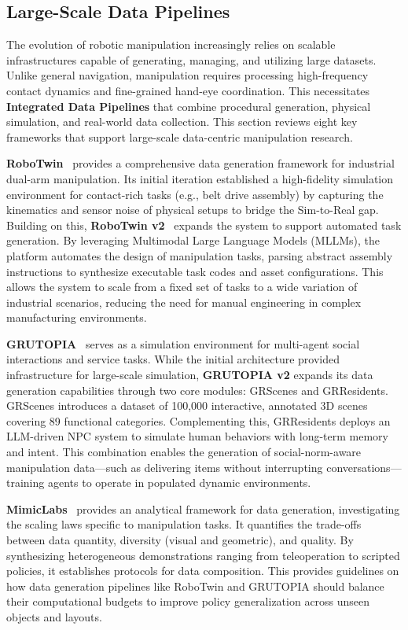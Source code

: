 \documentclass[acmsmall,screen,review,anonymous]{acmart}
\begin{document}
\subsection{Large-Scale Data Pipelines}\label{sec:data_factories_robotic_arms}

The evolution of robotic manipulation increasingly relies on scalable infrastructures capable of generating, managing, and utilizing large datasets. Unlike general navigation, manipulation requires processing high-frequency contact dynamics and fine-grained hand-eye coordination. This necessitates \textbf{Integrated Data Pipelines} that combine procedural generation, physical simulation, and real-world data collection. This section reviews eight key frameworks that support large-scale data-centric manipulation research.

\textbf{RoboTwin}~\cite{mu2024robotwin} provides a comprehensive data generation framework for industrial dual-arm manipulation. Its initial iteration established a high-fidelity simulation environment for contact-rich tasks (e.g., belt drive assembly) by capturing the kinematics and sensor noise of physical setups to bridge the Sim-to-Real gap. Building on this, \textbf{RoboTwin v2}~\cite{chen2025robotwin2} expands the system to support automated task generation. By leveraging Multimodal Large Language Models (MLLMs), the platform automates the design of manipulation tasks, parsing abstract assembly instructions to synthesize executable task codes and asset configurations. This allows the system to scale from a fixed set of tasks to a wide variation of industrial scenarios, reducing the need for manual engineering in complex manufacturing environments.

\textbf{GRUTOPIA}~\cite{wang2024grutopia} serves as a simulation environment for multi-agent social interactions and service tasks. While the initial architecture provided infrastructure for large-scale simulation, \textbf{GRUTOPIA v2} expands its data generation capabilities through two core modules: GRScenes and GRResidents. GRScenes introduces a dataset of 100,000 interactive, annotated 3D scenes covering 89 functional categories. Complementing this, GRResidents deploys an LLM-driven NPC system to simulate human behaviors with long-term memory and intent. This combination enables the generation of social-norm-aware manipulation data—such as delivering items without interrupting conversations—training agents to operate in populated dynamic environments.

\textbf{MimicLabs}~\cite{mimicLabs2024} provides an analytical framework for data generation, investigating the scaling laws specific to manipulation tasks. It quantifies the trade-offs between data quantity, diversity (visual and geometric), and quality. By synthesizing heterogeneous demonstrations ranging from teleoperation to scripted policies, it establishes protocols for data composition. This provides guidelines on how data generation pipelines like RoboTwin and GRUTOPIA should balance their computational budgets to improve policy generalization across unseen objects and layouts.
\end{document}
